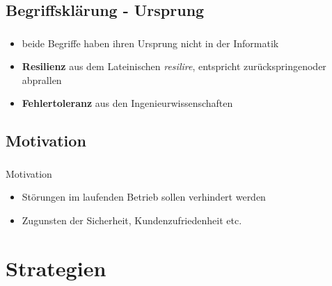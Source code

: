 \subsection{Begriffsklärung - Ursprung}

\begin{frame}
    \frametitle{\insertsection}
    \framesubtitle{\insertsubsection}

        \begin{itemize}
            \item beide Begriffe haben ihren Ursprung nicht in der Informatik
            \item \textbf{Resilienz} aus dem Lateinischen \textit{resilire}, entspricht \glqq zurückspringen\grqq oder  \glqq abprallen\grqq
            \item \textbf{Fehlertoleranz} aus den Ingenieurwissenschaften
        \end{itemize}
\end{frame}

\subsection{Motivation}

\begin{frame}
    \frametitle{\insertsection}
    \framesubtitle{\insertsubsection}

    \begin{block}{Motivation}
        \begin{itemize}
            \item Störungen im laufenden Betrieb sollen verhindert werden
            \item Zugunsten der Sicherheit, Kundenzufriedenheit etc.
        \end{itemize}
    \end{block}
\end{frame}

\section{Strategien}
